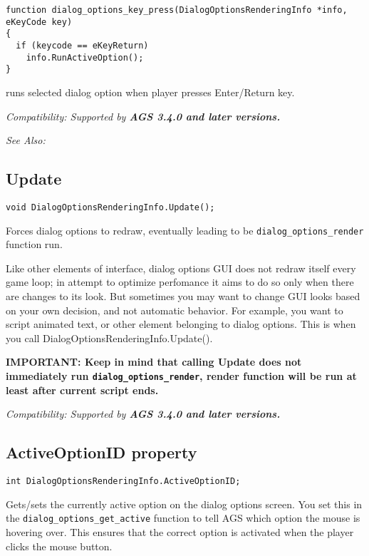 \begin{verbatim}
function dialog_options_key_press(DialogOptionsRenderingInfo *info, eKeyCode key)
{
  if (keycode == eKeyReturn)
    info.RunActiveOption();
}
\end{verbatim}
runs selected dialog option when player presses Enter/Return key.

\it{Compatibility:} Supported by \bf{AGS 3.4.0} and later versions.

\it{See Also:} 


\subsection{Update}\label{DialogOptionsRenderingInfo.Update}%

\begin{verbatim}
void DialogOptionsRenderingInfo.Update();
\end{verbatim}
Forces dialog options to redraw, eventually leading to be \verb$dialog_options_render$ function run.

Like other elements of interface, dialog options GUI does not redraw itself every game loop;
in attempt to optimize perfomance it aims to do so only when there are changes to its look.
But sometimes you may want to change GUI looks based on your own decision, and not automatic
behavior. For example, you want to script animated text, or other element belonging to dialog
options. This is when you call DialogOptionsRenderingInfo.Update().

\bf{IMPORTANT:} Keep in mind that calling \bf{Update} does not immediately run \verb$dialog_options_render$,
render function will be run at least after current script ends.

\it{Compatibility:} Supported by \bf{AGS 3.4.0} and later versions.


\subsection{ActiveOptionID property}\label{DialogOptionsRenderingInfo.ActiveOptionID}%

\begin{verbatim}
int DialogOptionsRenderingInfo.ActiveOptionID;
\end{verbatim}
Gets/sets the currently active option on the dialog options screen. You set this in the
\verb$dialog_options_get_active$ function to tell AGS which option the mouse is hovering over.
This ensures that the correct option is activated when the player clicks the mouse button.

